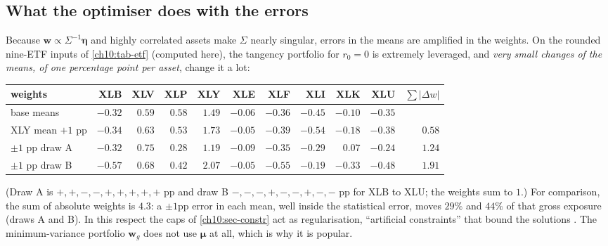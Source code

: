 \begin{paracol}{2}
\subsection{What the optimiser does with the errors}
Because $\bm w\propto\Sigma^{-1}\bm\eta$ and highly correlated assets make $\Sigma$ nearly singular, errors in
the means are amplified in the weights. On the rounded nine-ETF inputs of \cref{ch10:tab-etf} (computed here), the
tangency portfolio for $r_0=0$ is extremely leveraged, and \emph{very small changes of the means, of one
percentage point per asset}, change it a lot:
\begin{center}
\footnotesize
\begin{tabular}{@{}lrrrrrrrrrr@{}}
\toprule
weights & XLB & XLV & XLP & XLY & XLE & XLF & XLI & XLK & XLU & $\sum|\Delta w|$\\
\midrule
base means & $-0.32$ & $0.59$ & $0.58$ & $1.49$ & $-0.06$ & $-0.36$ & $-0.45$ & $-0.10$ & $-0.35$ & \\
XLY mean $+1$ pp & $-0.34$ & $0.63$ & $0.53$ & $1.73$ & $-0.05$ & $-0.39$ & $-0.54$ & $-0.18$ & $-0.38$ & $0.58$\\
$\pm1$ pp draw A & $-0.32$ & $0.75$ & $0.28$ & $1.19$ & $-0.09$ & $-0.35$ & $-0.29$ & $0.07$ & $-0.24$ & $1.24$\\
$\pm1$ pp draw B & $-0.57$ & $0.68$ & $0.42$ & $2.07$ & $-0.05$ & $-0.55$ & $-0.19$ & $-0.33$ & $-0.48$ & $1.91$\\
\bottomrule
\end{tabular}
\end{center}
(Draw A is $+,+,-,-,+,+,+,+,+$ pp and draw B $-,-,-,+,-,-,+,-,-$ pp for XLB to XLU; the weights sum to $1$.) For comparison,
the sum of absolute weights is $4.3$: a $\pm1$pp error in each mean, well inside the statistical
error, moves $29\%$ and $44\%$ of that gross exposure (draws A and B). In this respect the caps of \cref{ch10:sec-constr} act as
regularisation, ``artificial constraints'' that bound the solutions . The minimum-variance portfolio
$\bm w_g$ does not use $\bm\mu$ at all, which is why it is popular.


\end{paracol}
